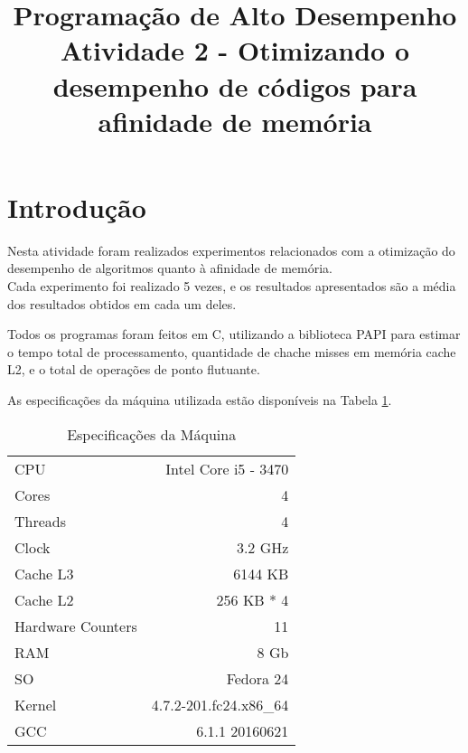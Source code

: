\documentclass[conference]{IEEEtran}
\begin{document}
\title{Programação de Alto Desempenho\\
\large Atividade 2 - Otimizando o desempenho de códigos para afinidade de memória}

\author{
 }

\maketitle


\section{Introdução}
Nesta atividade foram realizados experimentos relacionados com a otimização do desempenho de algoritmos quanto à afinidade de memória.\\
Cada experimento foi realizado 5 vezes, e os resultados apresentados são a média dos resultados obtidos em cada um deles.

Todos os programas foram feitos em C, utilizando a biblioteca PAPI para estimar o tempo total de processamento, quantidade de chache misses em memória cache L2, e o total de operações de ponto flutuante.

As especificações da máquina utilizada estão disponíveis na Tabela \ref{tab:cpu}.

\begin{table}[htb!]
\centering
\caption{Especificações da Máquina}
\label{tab:cpu}
\begin{tabular}{lr}
 CPU & Intel Core i5 - 3470\\
 Cores & 4\\
 Threads & 4\\
 Clock & 3.2 GHz\\
 Cache L3 & 6144 KB \\
 Cache L2 & 256 KB * 4 \\
 Hardware Counters & 11 \\
 RAM & 8 Gb \\
 SO & Fedora 24 \\
 Kernel & 4.7.2-201.fc24.x86\_64 \\
 GCC & 6.1.1 20160621\\
 
\end{tabular}
\end{table}
\end{document}
